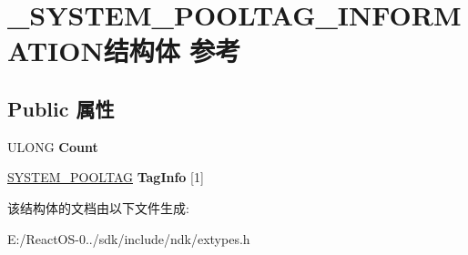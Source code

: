 \hypertarget{struct___s_y_s_t_e_m___p_o_o_l_t_a_g___i_n_f_o_r_m_a_t_i_o_n}{}\section{\+\_\+\+S\+Y\+S\+T\+E\+M\+\_\+\+P\+O\+O\+L\+T\+A\+G\+\_\+\+I\+N\+F\+O\+R\+M\+A\+T\+I\+O\+N结构体 参考}
\label{struct___s_y_s_t_e_m___p_o_o_l_t_a_g___i_n_f_o_r_m_a_t_i_o_n}
\subsection*{Public 属性}
\begin{DoxyCompactItemize}
\item 
\mbox{\label{struct___s_y_s_t_e_m___p_o_o_l_t_a_g___i_n_f_o_r_m_a_t_i_o_n_a433ee28c97a6c66ceb3dfe3ade304eca}} 
U\+L\+O\+NG {\bfseries Count}
\item 
\mbox{\label{struct___s_y_s_t_e_m___p_o_o_l_t_a_g___i_n_f_o_r_m_a_t_i_o_n_a34bfe961cd9f86b2ff149a92a933984a}} 
\hyperlink{struct___s_y_s_t_e_m___p_o_o_l_t_a_g}{S\+Y\+S\+T\+E\+M\+\_\+\+P\+O\+O\+L\+T\+AG} {\bfseries Tag\+Info} \mbox{[}1\mbox{]}
\end{DoxyCompactItemize}


该结构体的文档由以下文件生成\+:\begin{DoxyCompactItemize}
\item 
E\+:/\+React\+O\+S-\/0../sdk/include/ndk/extypes.\+h\end{DoxyCompactItemize}
